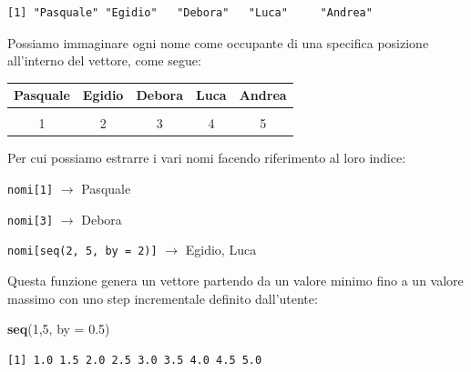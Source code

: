 \documentclass[
  a4paper,
  DIV=11,
  numbers=noendperiod]{scrreprt}
\newenvironment{Shaded}{\begin{snugshade}}{\end{snugshade}}
\newcommand{\AttributeTok}[1]{\textcolor[rgb]{0.13,0.29,0.53}{#1}}
\newcommand{\DecValTok}[1]{\textcolor[rgb]{0.00,0.00,0.81}{#1}}
\newcommand{\FloatTok}[1]{\textcolor[rgb]{0.00,0.00,0.81}{#1}}
\newcommand{\FunctionTok}[1]{\textcolor[rgb]{0.13,0.29,0.53}{\textbf{#1}}}
\newcommand{\NormalTok}[1]{#1}
\begin{document}
\begin{verbatim}
[1] "Pasquale" "Egidio"   "Debora"   "Luca"     "Andrea"  
\end{verbatim}

Possiamo immaginare ogni nome come occupante di una specifica posizione
all'interno del vettore, come segue:

\begin{table}[h]
\centering
\begin{tabular}{p{2cm}p{2cm}p{2cm}p{2cm}p{2cm}}
\hline
\multicolumn{1}{|c|}{Pasquale} & \multicolumn{1}{|c|}{Egidio}& \multicolumn{1}{|c|}{Debora} & \multicolumn{1}{|c|}{Luca} & \multicolumn{1}{|c|}{Andrea} \\\hline
& & & & \\
\multicolumn{1}{c}{1} & \multicolumn{1}{c}{2}& \multicolumn{1}{c}{3} & \multicolumn{1}{c}{4} & \multicolumn{1}{c}{5}\\
\end{tabular}
\end{table}

Per cui possiamo estrarre i vari nomi facendo riferimento al loro
indice:

\texttt{nomi{[}1{]}} \(\rightarrow\) Pasquale

\texttt{nomi{[}3{]}} \(\rightarrow\) Debora

\texttt{nomi{[}seq(2,\ 5,\ by\ =\ 2){]}} \(\rightarrow\) Egidio, Luca

\begin{tcolorbox}[enhanced jigsaw, toprule=.15mm, left=2mm, leftrule=.75mm, breakable, coltitle=black, title={\texttt{seq(min,\ max,\ by)}}, bottomtitle=1mm, opacitybacktitle=0.6, toptitle=1mm, titlerule=0mm, bottomrule=.15mm, colframe=quarto-callout-note-color-frame, arc=.35mm, rightrule=.15mm, opacityback=0, colbacktitle=quarto-callout-note-color!10!white, colback=white]

Questa funzione genera un vettore partendo da un valore minimo fino a un
valore massimo con uno step incrementale definito dall'utente:

\begin{Shaded}
\begin{Highlighting}[]
\FunctionTok{seq}\NormalTok{(}\DecValTok{1}\NormalTok{,}\DecValTok{5}\NormalTok{, }\AttributeTok{by =} \FloatTok{0.5}\NormalTok{)}
\end{Highlighting}
\end{Shaded}

\begin{verbatim}
[1] 1.0 1.5 2.0 2.5 3.0 3.5 4.0 4.5 5.0
\end{verbatim}

\end{tcolorbox}
\end{document}
